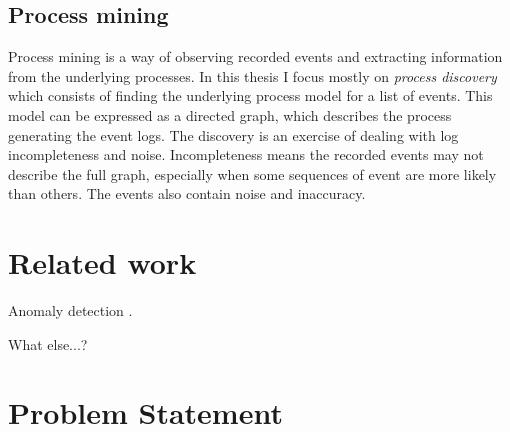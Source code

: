 \documentclass[english,12pt,a4paper,pdftex,sci,utf8]{aaltothesis}
\begin{document}



\subsection{Process mining}


Process mining is a way of observing recorded events and extracting information from the underlying processes.
In this thesis I focus mostly on \emph{process discovery} which consists of finding the underlying process model for a list of events. 
This model can be expressed as a directed graph, which describes the process generating the event logs. 
The discovery is an exercise of dealing with log incompleteness and noise.
Incompleteness means the recorded events may not describe the full graph, especially when some 
sequences of event are more likely than others. 
The events also contain noise and inaccuracy. \cite{van2013discovering}







\clearpage
\section{Related work}
\label{sec:relatedwork}

Anomaly detection \cite{bezerra2009anomaly}.

What else...?


\clearpage
\section{Problem Statement}
\label{sec:problem}
\end{document}
